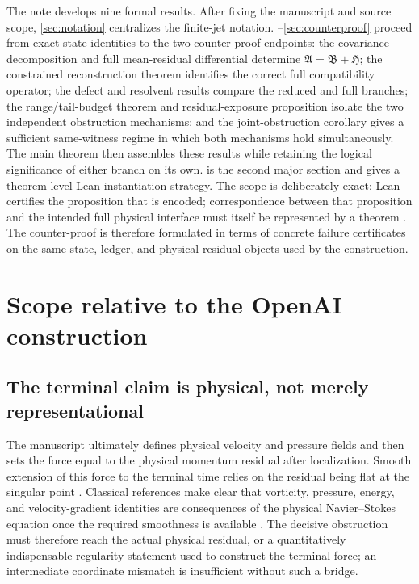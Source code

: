 \documentclass[12pt]{article}
\theoremstyle{plain}
\theoremstyle{definition}
\theoremstyle{remark}
\newcommand{\Comp}{\mathfrak A}
\newcommand{\Red}{\mathfrak B}
\newcommand{\Hidden}{\mathfrak H}
\begin{document}
The note develops nine formal results. After fixing the manuscript and source scope, \cref{sec:notation} centralizes the finite-jet notation. --\ref{sec:counterproof} proceed from exact state identities to the two counter-proof endpoints: the covariance decomposition and full mean-residual differential determine \(\Comp=\Red+\Hidden\); the constrained reconstruction theorem identifies the correct full compatibility operator; the defect and resolvent results compare the reduced and full branches; the range/tail-budget theorem and residual-exposure proposition isolate the two independent obstruction mechanisms; and the joint-obstruction corollary gives a sufficient same-witness regime in which both mechanisms hold simultaneously. The main theorem then assembles these results while retaining the logical significance of either branch on its own.  is the second major section and gives a theorem-level Lean instantiation strategy. The scope is deliberately exact: Lean certifies the proposition that is encoded; correspondence between that proposition and the intended full physical interface must itself be represented by a theorem \cite{deMouraEtAl2015,Lean4TPIL,Lean4Reference}. The counter-proof is therefore formulated in terms of concrete failure certificates on the same state, ledger, and physical residual objects used by the construction.

\section{Scope relative to the OpenAI construction}\label{sec:scope}
\subsection{The terminal claim is physical, not merely representational}
The manuscript ultimately defines physical velocity and pressure fields and then sets the force equal to the physical momentum residual after localization. Smooth extension of this force to the terminal time relies on the residual being flat at the singular point \cite[Secs.~9--10]{OpenAI2026}. Classical references make clear that vorticity, pressure, energy, and velocity-gradient identities are consequences of the physical Navier--Stokes equation once the required smoothness is available \cite{MajdaBertozzi2002,RobinsonRodrigoSadowski2016}. The decisive obstruction must therefore reach the actual physical residual, or a quantitatively indispensable regularity statement used to construct the terminal force; an intermediate coordinate mismatch is insufficient without such a bridge.
\end{document}
